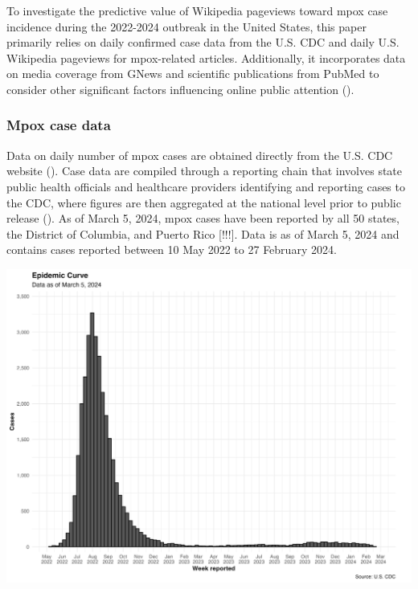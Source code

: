 \documentclass[
  12pt,
]{article}
\begin{document}
To investigate the predictive value of Wikipedia pageviews toward mpox
case incidence during the 2022-2024 outbreak in the United States, this
paper primarily relies on daily confirmed case data from the U.S. CDC
and daily U.S. Wikipedia pageviews for mpox-related articles.
Additionally, it incorporates data on media coverage from GNews and
scientific publications from PubMed to consider other significant
factors influencing online public attention
().

\subsubsection{Mpox case data}\label{mpox-case-data}

Data on daily number of mpox cases are obtained directly from the U.S.
CDC website (). Case data are compiled
through a reporting chain that involves state public health officials
and healthcare providers identifying and reporting cases to the CDC,
where figures are then aggregated at the national level prior to public
release (). As of March 5,
2024, mpox cases have been reported by all 50 states, the District of
Columbia, and Puerto Rico {[}!!!{]}. Data is as of March 5, 2024 and
contains cases reported between 10 May 2022 to 27 February 2024.

\begin{center}
\includegraphics{images/cases.png}
\end{center}
\end{document}
